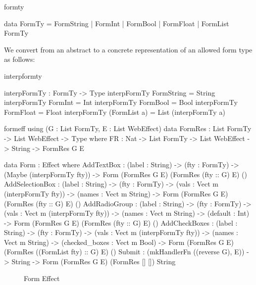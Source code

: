\begin{SaveVerbatim}{formty}

data FormTy = FormString | FormInt
            | FormBool   | FormFloat
            | FormList FormTy 

\end{SaveVerbatim}

\noindent
We convert
from an abstract to a concrete representation of an allowed form type as
follows:

\begin{SaveVerbatim}{interpformty}

interpFormTy : FormTy -> Type
interpFormTy FormString = String
interpFormTy FormInt = Int
interpFormTy FormBool = Bool
interpFormTy FormFloat = Float
interpFormTy (FormList a) = List (interpFormTy a)

\end{SaveVerbatim}

\begin{SaveVerbatim}{formeff}
using (G : List FormTy, E : List WebEffect)
  data FormRes : List FormTy -> List WebEffect -> Type where
    FR : Nat -> List FormTy -> List WebEffect -> String -> FormRes G E
  
  data Form : Effect where
    AddTextBox      : (label : String) -> (fty : FormTy) -> (Maybe (interpFormTy fty)) -> 
                      Form (FormRes G E) (FormRes (fty :: G) E) () 
    AddSelectionBox : (label : String) -> (fty : FormTy) -> (vals : Vect m (interpFormTy fty)) -> 
                      (names : Vect m String) ->
                      Form (FormRes G E)  (FormRes (fty :: G) E) ()
    AddRadioGroup   : (label : String) -> (fty : FormTy) -> (vals : Vect m (interpFormTy fty)) ->
                      (names : Vect m String) -> (default : Int) ->
                      Form (FormRes G E)  (FormRes (fty :: G) E) ()
    AddCheckBoxes   : (label : String) -> (fty : FormTy) -> (vals : Vect m (interpFormTy fty)) ->
                      (names : Vect m String) -> (checked_boxes : Vect m Bool) ->
                      Form (FormRes G E)  (FormRes ((FormList fty) :: G) E) ()
    Submit          : (mkHandlerFn ((reverse G), E)) -> String -> 
                      Form (FormRes G E)  (FormRes [] [])       String
\end{SaveVerbatim}

\begin{figure*}[t]
\begin{center}
\end{center}
\caption{Form Effect}
\label{fig:formeffect}
\end{figure*}

